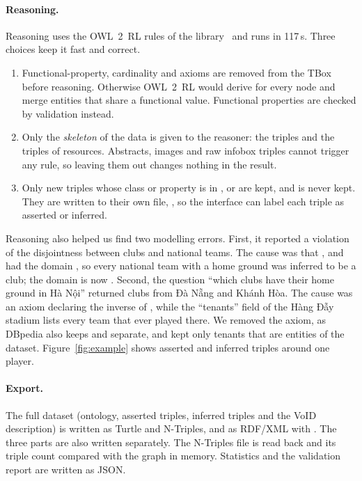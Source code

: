 \paragraph{Reasoning.}
\label{sec:reasoning}
Reasoning uses the OWL~2~RL rules of the 
library~\cite{motik2012owl2profiles, rdflib} and runs in 117\,s. Three choices
keep it fast and correct.
\begin{enumerate}
  \item Functional-property, cardinality and  axioms are
        removed from the TBox before reasoning. Otherwise OWL~2~RL would
        derive  for every node and merge entities that
        share a functional value. Functional properties are checked by
        validation instead.
  \item Only the \emph{skeleton} of the data is given to the reasoner: the
         triples and the  triples of 
        resources. Abstracts, images and raw infobox triples cannot trigger
        any rule, so leaving them out changes nothing in the result.
  \item Only new triples whose class or property is in ,
         or  are kept, and  is never
        kept. They are written to their own file, , so the
        interface can label each triple as asserted or inferred.
\end{enumerate}
Reasoning also helped us find two modelling errors. First, it reported a
violation of the disjointness between clubs and national teams. The cause was
that ,  and  had the
domain , so every national team with a home ground was
inferred to be a club; the domain is now . Second, the
question ``which clubs have their home ground in Hà Nội'' returned clubs from
Đà Nẵng and Khánh Hòa. The cause was an axiom declaring  the
inverse of , while the ``tenants'' field of the Hàng Đẫy
stadium lists every team that ever played there. We removed the axiom, as
DBpedia also keeps  and  separate, and kept
only tenants that are entities of the dataset. Figure~\ref{fig:example} shows
asserted and inferred triples around one player.

\paragraph{Export.} The full dataset (ontology, asserted triples, inferred
triples and the VoID description) is written as Turtle and N-Triples, and as
RDF/XML with . The three parts are also written separately. The
N-Triples file is read back and its triple count compared with the graph in
memory. Statistics and the validation report are written as JSON.

